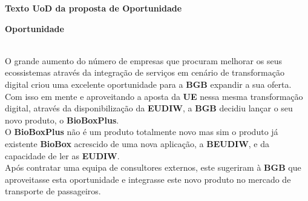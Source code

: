 \documentclass[12pt,a4paper]{article}
\begin{document}
{\selectfont
\begin{center}
\begin{large}
    \textbf{Texto UoD da proposta de Oportunidade}
\end{large}
\end{center}

\begin{small}
\begin{normalsize}
\textbf{Oportunidade}
\end{normalsize}\\
O grande aumento do número de empresas que procuram melhorar os seus ecossistemas através da integração de serviços em cenário de transformação digital criou uma excelente oportunidade para a \textbf{BGB} expandir a sua oferta.\\
Com isso em mente e aproveitando a aposta da \textbf{UE} nessa mesma transformação digital, através da disponibilização da \textbf{EUDIW}, a \textbf{BGB} decidiu lançar o seu novo produto, o \textbf{BioBoxPlus}.\\
O \textbf{BioBoxPlus} não é um produto totalmente novo mas sim o produto já existente \textbf{BioBox} acrescido de uma nova aplicação, a \textbf{BEUDIW}, e da capacidade de ler as \textbf{EUDIW}.\\
Após contratar uma equipa de consultores externos, este sugeriram à \textbf{BGB} que aproveitasse esta oportunidade e integrasse este novo produto no mercado de transporte de passageiros.\\


\end{small}}
\end{document}
